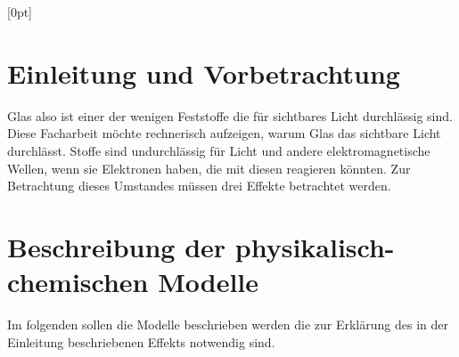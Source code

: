\documentclass[11pt,a4paper,oneside]{report}
\begin{document}
\titlespacing{\chapter}{0em}{1em}{1.5em}[0pt]
\renewcommand{\contentsname}{Inhaltsverzeichnis}
\renewcommand{\bibname}{Quellen}
\setlength{\parindent}{0em}

\pagestyle{fancy}
\fancyhf{}
\fancyhead[CEO]{\thepage}
\renewcommand{\headrulewidth}{0pt}

\setcounter{page}{2}


\tableofcontents

\clearpage

\chapter{Einleitung und Vorbetrachtung}

Glas also  ist einer der wenigen Feststoffe die für sichtbares Licht durchlässig sind. Diese Facharbeit möchte rechnerisch aufzeigen, warum Glas das sichtbare Licht durchlässt.
Stoffe sind undurchlässig für Licht und andere elektromagnetische Wellen, wenn sie Elektronen haben, die mit diesen reagieren könnten.
Zur Betrachtung dieses Umstandes müssen drei Effekte betrachtet werden. \cite{pape99}

\chapter{Beschreibung der physikalisch-chemischen Modelle}
Im folgenden sollen die Modelle beschrieben werden die zur Erklärung des in der Einleitung beschriebenen Effekts notwendig sind.
\end{document}
